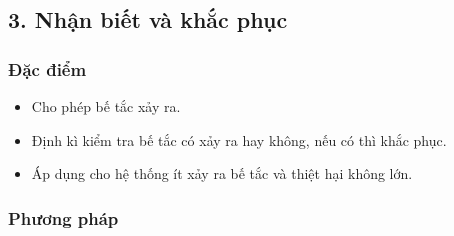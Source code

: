 \documentclass[12pt]{report}
\begin{document}
\subsection*{3. Nhận biết và khắc phục}
\subsubsection*{Đặc điểm}
\begin{itemize}
	\item Cho phép bế tắc xảy ra.
	\item Định kì kiểm tra bế tắc có xảy ra hay không, nếu có thì khắc phục.
	\item Áp dụng cho hệ thống ít xảy ra bế tắc và thiệt hại không lớn.
\end{itemize}
\subsubsection*{Phương pháp}
\end{document}
